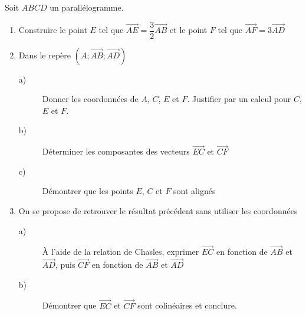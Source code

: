 \begin{exercice}
Soit $ABCD$ un parallélogramme.
\begin{enumerate}
\item Construire le point $E$ tel que $\overrightarrow{AE}=\dfrac{3}{2}\overrightarrow{AB}$ et le point $F$ tel que $\overrightarrow{AF}=3\overrightarrow{AD}$
\item Dans le repère $(A;\overrightarrow{AB};\overrightarrow{AD})$
\begin{description}
\item[a)] Donner les coordonnées de $A$, $C$, $E$ et $F$. Justifier par un calcul pour $C$, $E$ et $F$.
\item[b)] Déterminer les composantes des vecteurs $\overrightarrow{EC}$ et $\overrightarrow{CF}$
\item[c)]Démontrer que les points $E$, $C$ et $F$ sont alignés
\end{description}
\item On se propose de retrouver le résultat précédent sans utiliser les coordonnées
\begin{description}
\item[a)] À l'aide de la relation de Chasles, exprimer $\overrightarrow{EC}$ en fonction de $\overrightarrow{AB}$ et $\overrightarrow{AD}$, puis $\overrightarrow{CF}$ en fonction de $\overrightarrow{AB}$ et $\overrightarrow{AD}$
\item[b)] Démontrer que $\overrightarrow{EC}$ et $\overrightarrow{CF}$ sont colinéaires et conclure.
\end{description}
\end{enumerate}

\end{exercice}